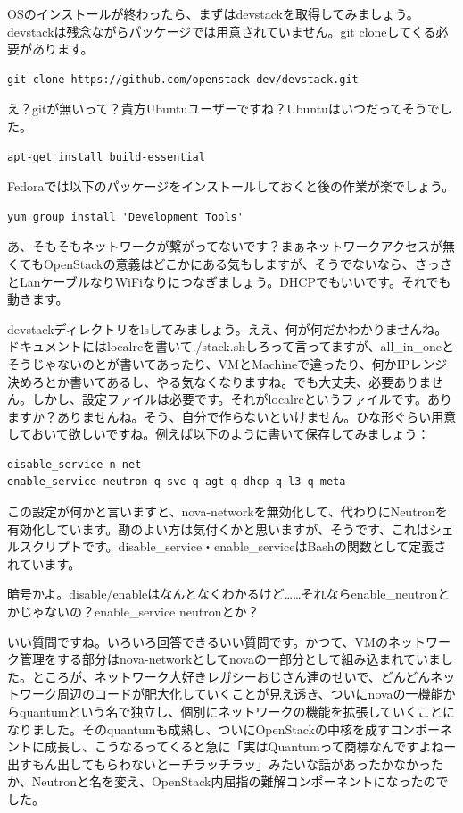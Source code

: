 \documentclass[8pt,b5paper,tombo,openany]{jsbook}
\begin{document}
OSのインストールが終わったら、まずはdevstackを取得してみましょう。devstackは残念ながらパッケージでは用意されていません。git cloneしてくる必要があります。

\begin{lstlisting}
git clone https://github.com/openstack-dev/devstack.git
\end{lstlisting}


え？gitが無いって？貴方Ubuntuユーザーですね？Ubuntuはいつだってそうでした。

\begin{lstlisting}
apt-get install build-essential
\end{lstlisting}

Fedoraでは以下のパッケージをインストールしておくと後の作業が楽でしょう。

\begin{lstlisting}
yum group install 'Development Tools'
\end{lstlisting}

あ、そもそもネットワークが繋がってないです？まぁネットワークアクセスが無くてもOpenStackの意義はどこかにある気もしますが、そうでないなら、さっさとLanケーブルなりWiFiなりにつなぎましょう。DHCPでもいいです。それでも動きます。

devstackディレクトリをlsしてみましょう。ええ、何が何だかわかりませんね。ドキュメントにはlocalrcを書いて./stack.shしろって言ってますが、all\_in\_oneとそうじゃないのとが書いてあったり、VMとMachineで違ったり、何かIPレンジ決めろとか書いてあるし、やる気なくなりますね。でも大丈夫、必要ありません。しかし、設定ファイルは必要です。それがlocalrcというファイルです。ありますか？ありませんね。そう、自分で作らないといけません。ひな形ぐらい用意しておいて欲しいですね。例えば以下のように書いて保存してみましょう：

\begin{lstlisting}
disable_service n-net
enable_service neutron q-svc q-agt q-dhcp q-l3 q-meta
\end{lstlisting}

この設定が何かと言いますと、nova-networkを無効化して、代わりにNeutronを有効化しています。勘のよい方は気付くかと思いますが、そうです、これはシェルスクリプトです。disable\_service・enable\_serviceはBashの関数として定義されています。

暗号かよ。disable/enableはなんとなくわかるけど……それならenable\_neutronとかじゃないの？enable\_service neutronとか？

いい質問ですね。いろいろ回答できるいい質問です。かつて、VMのネットワーク管理をする部分はnova-networkとしてnovaの一部分として組み込まれていました。ところが、ネットワーク大好きレガシーおじさん達のせいで、どんどんネットワーク周辺のコードが肥大化していくことが見え透き、ついにnovaの一機能からquantumという名で独立し、個別にネットワークの機能を拡張していくことになりました。そのquantumも成熟し、ついにOpenStackの中核を成すコンポーネントに成長し、こうなるってくると急に「実はQuantumって商標なんですよねー出すもん出してもらわないとーチラッチラッ」みたいな話があったかなかったか、Neutronと名を変え、OpenStack内屈指の難解コンポーネントになったのでした。
\end{document}
